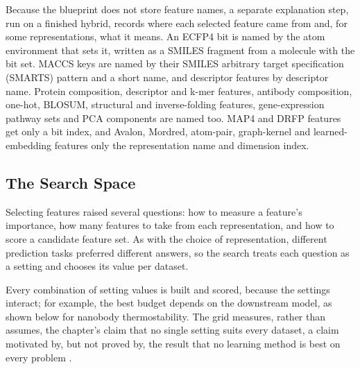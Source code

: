 
Because the blueprint does not store feature names, a separate explanation step, run on a finished hybrid, records where each selected feature came from and, for some representations, what it means. An ECFP4 bit is named by the atom environment that sets it, written as a SMILES fragment from a molecule with the bit set. MACCS keys are named by their SMILES arbitrary target specification (SMARTS) pattern and a short name, and descriptor features by descriptor name. Protein composition, descriptor and k-mer features, antibody composition, one-hot, BLOSUM, structural and inverse-folding features, gene-expression pathway sets and PCA components are named too. MAP4 and DRFP features get only a bit index, and Avalon, Mordred, atom-pair, graph-kernel and learned-embedding features only the representation name and dimension index.

\subsection{The Search Space}\label{sec:method:searchspace}

Selecting features raised several questions: how to measure a feature's importance, how many features to take from each representation, and how to score a candidate feature set. As with the choice of representation, different prediction tasks preferred different answers, so the search treats each question as a setting and chooses its value per dataset.

Every combination of setting values is built and scored, because the settings interact; for example, the best budget depends on the downstream model, as shown below for nanobody thermostability. The grid measures, rather than assumes, the chapter's claim that no single setting suits every dataset, a claim motivated by, but not proved by, the result that no learning method is best on every problem \citep{Wolpert1996}.

